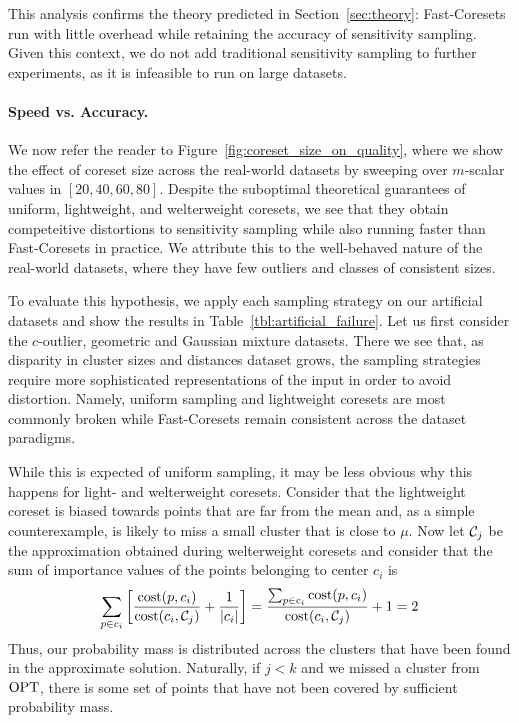 This analysis confirms the theory predicted in Section~\ref{sec:theory}: Fast-Coresets run with little overhead while retaining the accuracy of sensitivity sampling.
Given this context, we do not add traditional sensitivity sampling to further experiments, as it is infeasible to run on large datasets.

\paragraph*{Speed vs. Accuracy.}

We now refer the reader to Figure~\ref{fig:coreset_size_on_quality}, where we show the effect of coreset size across the real-world datasets by sweeping over
$m$-scalar values in $[20, 40, 60, 80]$. Despite the suboptimal theoretical guarantees of uniform, lightweight, and welterweight coresets, we see that they
obtain competeitive distortions to sensitivity sampling while also running faster than Fast-Coresets in practice. We attribute this to the well-behaved nature
of the real-world datasets, where they have few outliers and classes of consistent sizes.

To evaluate this hypothesis, we apply each sampling strategy on our artificial datasets and show the results in Table~\ref{tbl:artificial_failure}.  Let us
first consider the $c$-outlier, geometric and Gaussian mixture datasets. There we see that, as disparity in cluster sizes and distances dataset grows, the
sampling strategies require more sophisticated representations of the input in order to avoid distortion. Namely, uniform sampling and lightweight coresets are
most commonly broken while Fast-Coresets remain consistent across the dataset paradigms.

While this is expected of uniform sampling, it may be less obvious why this happens for light- and welterweight coresets. Consider that the lightweight coreset
is biased towards points that are far from the mean and, as a simple counterexample, is likely to miss a small cluster that is close to $\mu$.  Now let
$\mathcal C_j$ be the approximation obtained during welterweight coresets and consider that the sum of importance values of the points belonging to center $c_i$ is
\begin{equation*}
    \sum_{p \in c_i} \left[ \dfrac{\operatorname{cost}(p, c_i)}{\operatorname{cost}(c_i, \mathcal C_j)} + \dfrac{1}{|c_i|} \right]
    = \dfrac{\sum_{p \in c_i} \operatorname{cost}(p, c_i)}{\operatorname{cost}(c_i, \mathcal C_j)} + 1
    = 2
\end{equation*}
Thus, our probability mass is distributed across the clusters that have been found in the approximate solution. Naturally, if $j < k$ and we missed a cluster
from $\text{OPT}$, there is some set of points that have not been covered by sufficient probability mass.

